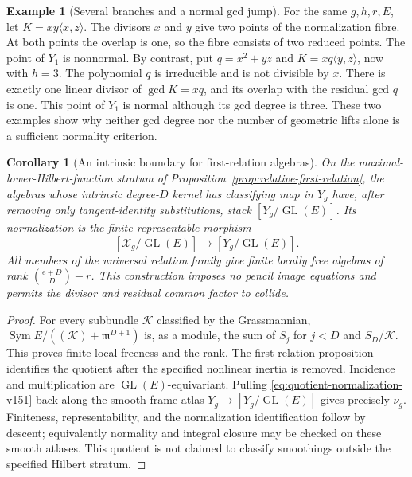 \documentclass[11pt,reqno]{amsart}
\numberwithin{equation}{section}
\newtheorem{corollary}[theorem]{Corollary}
\theoremstyle{definition}\newtheorem{definition}[theorem]{Definition}
\newtheorem{example}[theorem]{Example}
\theoremstyle{remark}\newtheorem{remark}[theorem]{Remark}
\DeclareMathOperator{\Sym}{Sym}\DeclareMathOperator{\Gr}{Gr}
\begin{document}
\begin{example}[Several branches and a normal gcd jump]
\label{ex:branches-normal-jump-v151}
For the same \(g,h,r,E\), let
\(K=xy\langle x,z\rangle\).  The divisors \(x\) and \(y\)
give two points of the normalization fibre.  At both points the
overlap is one, so the fibre consists of two reduced points.
The point of \(Y_1\) is nonnormal.  By contrast, put
\(q=x^2+yz\) and \(K=xq\langle y,z\rangle\), now with \(h=3\).
The polynomial \(q\) is irreducible and is not divisible by \(x\).
There is exactly one linear divisor of \(\gcd K=xq\), and its
overlap with the residual gcd \(q\) is one.  This point of \(Y_1\)
is normal although its gcd degree is three.  These two examples
show why neither gcd degree nor the number of geometric lifts alone
is a sufficient normality criterion.
\end{example}

\begin{corollary}[An intrinsic boundary for first-relation algebras]
\label{cor:algebra-boundary-v151}
On the maximal-lower-Hilbert-function stratum of
Proposition~\ref{prop:relative-first-relation}, the algebras whose
intrinsic degree-\(D\) kernel has classifying map in \(Y_g\)
have, after removing only tangent-identity substitutions, stack
\([Y_g/\operatorname{GL}(E)]\).  Its normalization is the finite
representable morphism
\begin{equation}\label{eq:quotient-normalization-v151}
 [\mathscr X_g/\operatorname{GL}(E)]
                    \longrightarrow[Y_g/\operatorname{GL}(E)].
\end{equation}
All members of the universal relation family give finite locally
free algebras of rank \(\binom{e+D}{D}-r\).  This construction imposes
no pencil image equations and permits the divisor and residual
common factor to collide.
\end{corollary}
\begin{proof}
For every subbundle \(\mathcal K\) classified by the Grassmannian,
\(\Sym E/((\mathcal K)+\mathfrak m^{D+1})\) is, as a module,
the sum of \(S_j\) for \(j<D\) and \(S_D/\mathcal K\).
This proves finite local freeness and the rank.  The first-relation
proposition identifies the quotient after the specified nonlinear
inertia is removed.  Incidence and multiplication are
\(\operatorname{GL}(E)\)-equivariant.  Pulling
\eqref{eq:quotient-normalization-v151} back along the smooth frame
atlas \(Y_g\to[Y_g/\operatorname{GL}(E)]\) gives precisely
\(\nu_g\).  Finiteness, representability, and the normalization
identification follow by descent; equivalently normality and integral
closure may be checked on these smooth atlases.  This quotient is
not claimed to classify smoothings outside the specified Hilbert
stratum.
\end{proof}
\end{document}

